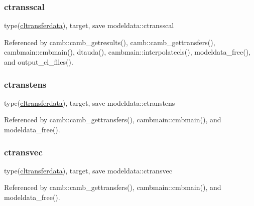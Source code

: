\mbox{\label{namespacemodeldata_a34bd8af8076e850aa1bd0bd9979be120}} 
\subsubsection{\texorpdfstring{ctransscal}{ctransscal}}
{\footnotesize\ttfamily type(\mbox{\hyperlink{structmodeldata_1_1cltransferdata}{cltransferdata}}), target, save modeldata\+::ctransscal}



Referenced by camb\+::camb\+\_\+getresults(), camb\+::camb\+\_\+gettransfers(), cambmain\+::cmbmain(), dtauda(), cambmain\+::interpolatecls(), modeldata\+\_\+free(), and output\+\_\+cl\+\_\+files().

\mbox{\label{namespacemodeldata_a432da70b3966012f72663b1b37c5f44d}} 
\subsubsection{\texorpdfstring{ctranstens}{ctranstens}}
{\footnotesize\ttfamily type(\mbox{\hyperlink{structmodeldata_1_1cltransferdata}{cltransferdata}}), target, save modeldata\+::ctranstens}



Referenced by camb\+::camb\+\_\+gettransfers(), cambmain\+::cmbmain(), and modeldata\+\_\+free().

\mbox{\label{namespacemodeldata_ad30179531817ef1d8f3c57eeb179702d}} 
\subsubsection{\texorpdfstring{ctransvec}{ctransvec}}
{\footnotesize\ttfamily type(\mbox{\hyperlink{structmodeldata_1_1cltransferdata}{cltransferdata}}), target, save modeldata\+::ctransvec}



Referenced by camb\+::camb\+\_\+gettransfers(), cambmain\+::cmbmain(), and modeldata\+\_\+free().

\mbox{\label{namespacemodeldata_a446d6a37d3ee5445c94a5f0d5470021a}} 
